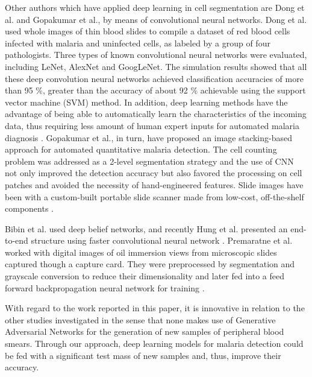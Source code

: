 Other authors which have applied deep learning in cell segmentation are Dong et al. and Gopakumar et al., by means of convolutional neural networks. Dong et al. used whole images of thin blood slides to compile a dataset of red blood cells infected with malaria and uninfected cells, as labeled by a group of four pathologists. Three types of known convolutional neural networks were evaluated, including LeNet, AlexNet and GoogLeNet. The simulation results showed that all these deep convolution neural networks achieved classification accuracies of more than 95 \%, greater than the accuracy of about 92 \% achievable using the support vector machine (SVM) method. In addition, deep learning methods have the advantage of being able to automatically learn the characteristics of the incoming data, thus requiring less amount of human expert inputs for automated malaria diagnosis \cite {Dong2017} \cite{Dong2017a}. Gopakumar et al., in turn, have proposed an image stacking-based approach for automated quantitative malaria detection. The cell counting problem was addressed as a 2-level segmentation strategy and the use of CNN not only improved the detection accuracy but also favored the processing on cell patches and avoided the necessity of hand-engineered features. Slide images have been with a custom-built portable slide scanner made from low-cost, off-the-shelf components \cite{Gopakumar2018ConvolutionalScanner}.




Bibin et al. used deep belief networks, and recently Hung et al. presented an end-to-end structure using faster convolutional neural network \cite{Bibin2017} \cite{hung2017applying}. Premaratne et al. worked with digital images of oil immersion views from microscopic slides captured though a capture card. They were preprocessed by segmentation and grayscale conversion to reduce their dimensionality and later fed into a feed forward backpropagation neural network for training \cite{Premaratne2006AFilms}.



With regard to the work reported in this paper, it is innovative in relation to the other studies investigated in the sense that none makes use of Generative Adversarial Networks for the generation of new samples of peripheral blood smears. Through our approach, deep learning models for malaria detection could be fed with a significant test mass of new samples and, thus, improve their accuracy.


